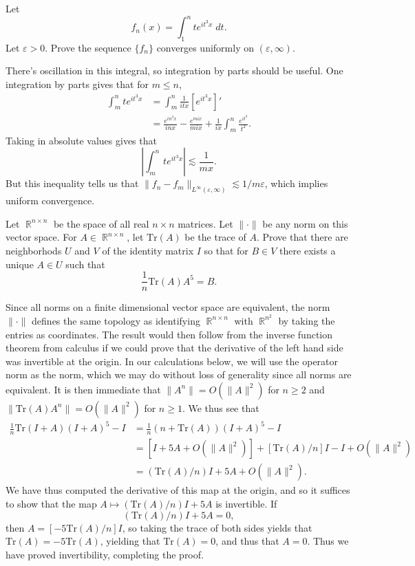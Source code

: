 \documentclass[answers]{exam}
\DeclareMathOperator{\RR}{\mathbb{R}}
\begin{document}
\begin{questions}
\question Let
%
\[ f_n(x) = \int_1^n t e^{it^3 x}\; dt. \]
%
Let $\varepsilon > 0$. Prove the sequence $\{ f_n \}$ converges uniformly on $(\varepsilon,\infty)$.
\begin{solution}
	There's oscillation in this integral, so integration by parts should be useful. One integration by parts gives that for $m \leq n$,
	\begin{align*}
		\int_m^n t e^{i t^3 x} &= \int_m^n \frac{1}{itx} [ e^{it^3 x} ]'\\
		&= \frac{e^{in^3 x}}{inx} - \frac{e^{mix}}{mix} + \frac{1}{ix} \int_m^n \frac{e^{it^3}}{t^2}.
	\end{align*}
	Taking in absolute values gives that
	\[ \left| \int_m^n t e^{it^3 x} \right| \lesssim \frac{1}{mx}. \]
	But this inequality tells us that $\| f_n - f_m \|_{L^\infty(\varepsilon,\infty)} \lesssim 1/m \varepsilon$, which implies uniform convergence.
\end{solution}

\question Let $\RR^{n \times n}$ be the space of all real $n \times n$ matrices. Let $\| \cdot \|$ be any norm on this vector space. For $A \in \RR^{n \times n}$, let $\text{Tr}(A)$ be the trace of $A$. Prove that there are neighborhods $U$ and $V$ of the identity matrix $I$ so that for $B \in V$ there exists a unique $A \in U$ such that
%
\[ \frac{1}{n} \text{Tr}(A) A^5 = B. \]
\begin{solution}
	Since all norms on a finite dimensional vector space are equivalent, the norm $\| \cdot \|$ defines the same topology as identifying $\RR^{n \times n}$ with $\RR^{n^2}$ by taking the entries as coordinates. The result would then follow from the inverse function theorem from calculus if we could prove that the derivative of the left hand side was invertible at the origin. In our calculations below, we will use the operator norm as the norm, which we may do without loss of generality since all norms are equivalent. It is then immediate that $\| A^n \| = O( \| A \|^2 )$ for $n \geq 2$ and $\| \text{Tr}(A) A^n \| = O( \| A \|^2 )$ for $n \geq 1$. We thus see that
	\begin{align*}
		\frac{1}{n} \text{Tr}(I + A) (I + A)^5 - I &= \frac{1}{n} ( n + \text{Tr}(A) ) (I + A)^5 - I\\
		&= [ I + 5 A + O(\| A \|^2) ] + [\text{Tr}(A) / n] I - I + O( \|A\|^2)\\
		&= ( \text{Tr}(A) / n ) I + 5 A + O( \| A \|^2).
	\end{align*}
	We have thus computed the derivative of this map at the origin, and so it suffices to show that the map $A \mapsto ( \text{Tr}(A) / n ) I + 5 A$ is invertible. If
	\[ ( \text{Tr}(A) / n ) I + 5 A = 0, \]
	then $A = [- 5 \text{Tr}(A) / n] I$, so taking the trace of both sides yields that $\text{Tr}(A) = -5 \text{Tr}(A)$, yielding that $\text{Tr}(A) = 0$, and thus that $A = 0$. Thus we have proved invertibility, completing the proof.
\end{solution}


\end{questions}
\end{document}
